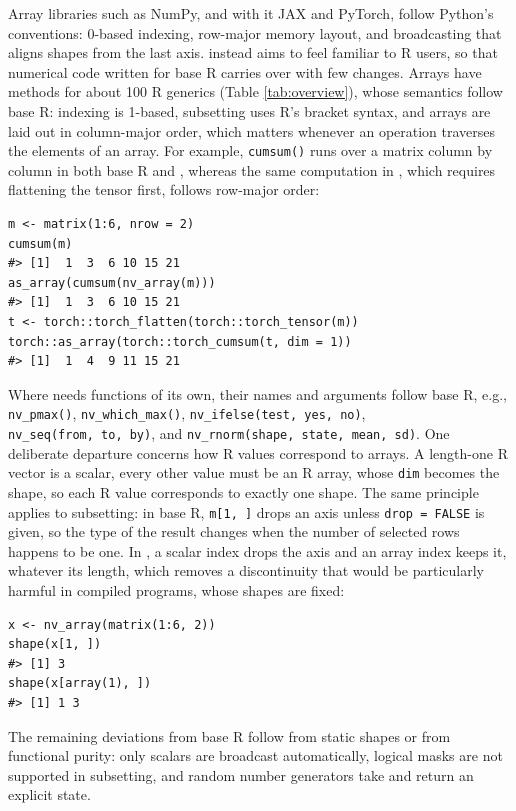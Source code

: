 Array libraries such as NumPy, and with it JAX and PyTorch, follow Python's conventions: 0-based indexing, row-major memory layout, and broadcasting that aligns shapes from the last axis.
 instead aims to feel familiar to R users, so that numerical code written for base R carries over with few changes.
Arrays have methods for about 100 R generics (Table \ref{tab:overview}), whose semantics follow base R: indexing is 1-based, subsetting uses R's bracket syntax, and arrays are laid out in column-major order, which matters whenever an operation traverses the elements of an array.
For example, \texttt{cumsum()} runs over a matrix column by column in both base R and , whereas the same computation in , which requires flattening the tensor first, follows row-major order:

\begin{verbatim}
m <- matrix(1:6, nrow = 2)
cumsum(m)
#> [1]  1  3  6 10 15 21
as_array(cumsum(nv_array(m)))
#> [1]  1  3  6 10 15 21
t <- torch::torch_flatten(torch::torch_tensor(m))
torch::as_array(torch::torch_cumsum(t, dim = 1))
#> [1]  1  4  9 11 15 21
\end{verbatim}

Where  needs functions of its own, their names and arguments follow base R, e.g., \texttt{nv\_pmax()}, \texttt{nv\_which\_max()}, \texttt{nv\_ifelse(test,\ yes,\ no)}, \texttt{nv\_seq(from,\ to,\ by)}, and \texttt{nv\_rnorm(shape,\ state,\ mean,\ sd)}.
One deliberate departure concerns how R values correspond to arrays.
A length-one R vector is a scalar, every other value must be an R array, whose \texttt{dim} becomes the shape, so each R value corresponds to exactly one shape.
The same principle applies to subsetting: in base R, \texttt{m{[}1,\ {]}} drops an axis unless \texttt{drop\ =\ FALSE} is given, so the type of the result changes when the number of selected rows happens to be one.
In , a scalar index drops the axis and an array index keeps it, whatever its length, which removes a discontinuity that would be particularly harmful in compiled programs, whose shapes are fixed:

\begin{verbatim}
x <- nv_array(matrix(1:6, 2))
shape(x[1, ])
#> [1] 3
shape(x[array(1), ])
#> [1] 1 3
\end{verbatim}

The remaining deviations from base R follow from static shapes or from functional purity: only scalars are broadcast automatically, logical masks are not supported in subsetting, and random number generators take and return an explicit state.

